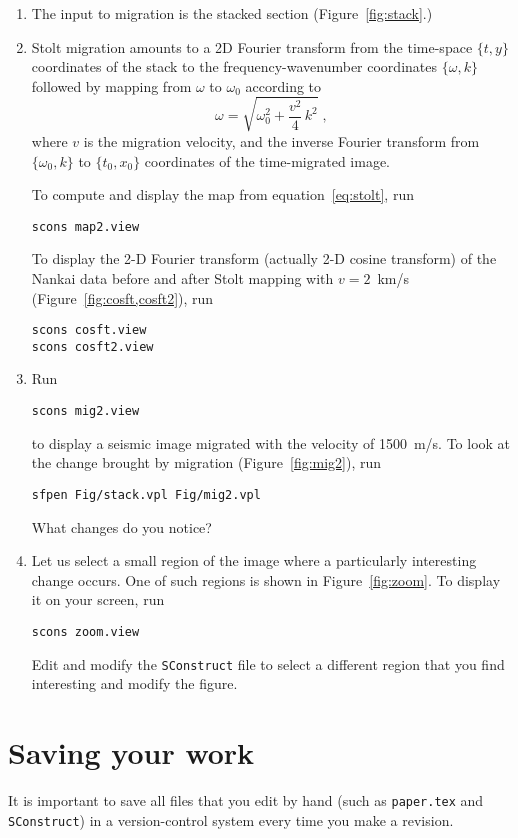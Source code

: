 \begin{enumerate}          
\item The input to migration is the stacked section (Figure~\ref{fig:stack}.)
\item Stolt migration amounts to a 2D Fourier transform from the time-space $\{t,y\}$ coordinates of the stack to the frequency-wavenumber coordinates $\{\omega,k\}$ followed by mapping from $\omega$ to $\omega_0$ according to
\begin{equation}
\label{eq:stolt}
\omega = \sqrt{\omega_0^2 + \frac{v^2}{4}\,k^2}\;,
\end{equation}
where $v$ is the migration velocity, and the inverse Fourier transform
from $\{\omega_0,k\}$ to $\{t_0,x_0\}$ coordinates of the
time-migrated image.

To compute and display the map from equation~\ref{eq:stolt}, run
\begin{verbatim}
scons map2.view
\end{verbatim}

To display the 2-D Fourier transform (actually 2-D cosine transform)
of the Nankai data before and after Stolt mapping with
$v=2$~km/s (Figure~\ref{fig:cosft,cosft2}), run
\begin{verbatim}
scons cosft.view
scons cosft2.view
\end{verbatim}


\item Run
\begin{verbatim}
scons mig2.view
\end{verbatim}
to display a seismic image migrated with the velocity of 1500~m/s. To look at the change brought by migration (Figure~\ref{fig:mig2}), run
\begin{verbatim}
sfpen Fig/stack.vpl Fig/mig2.vpl
\end{verbatim}
What changes do you notice?

\answer{%
}


\item Let us select a small region of the image where a particularly interesting change occurs. One of such regions is shown in Figure~\ref{fig:zoom}. To display it on your screen, run
\begin{verbatim}
scons zoom.view
\end{verbatim}


Edit and modify the \texttt{SConstruct} file to select a different region that you find interesting and modify the figure.

\end{enumerate}


\section{Saving your work}

It is important to save all files that you edit by hand (such
as \texttt{paper.tex} and \texttt{SConstruct}) in a version-control
system every time you make a revision.





